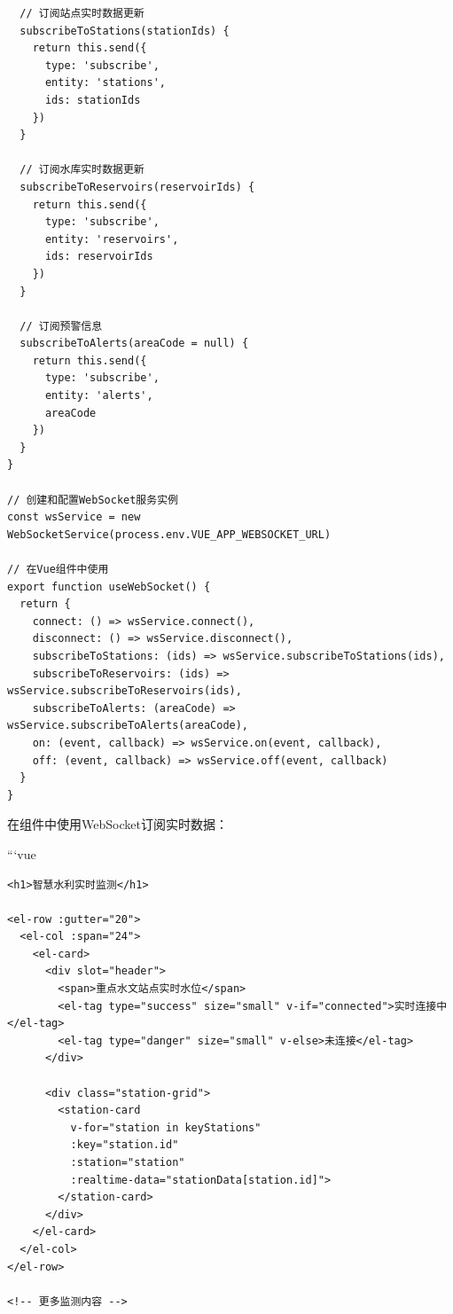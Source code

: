 \begin{lstlisting}
  // 订阅站点实时数据更新
  subscribeToStations(stationIds) {
    return this.send({
      type: 'subscribe',
      entity: 'stations',
      ids: stationIds
    })
  }
  
  // 订阅水库实时数据更新
  subscribeToReservoirs(reservoirIds) {
    return this.send({
      type: 'subscribe',
      entity: 'reservoirs',
      ids: reservoirIds
    })
  }
  
  // 订阅预警信息
  subscribeToAlerts(areaCode = null) {
    return this.send({
      type: 'subscribe',
      entity: 'alerts',
      areaCode
    })
  }
}

// 创建和配置WebSocket服务实例
const wsService = new WebSocketService(process.env.VUE_APP_WEBSOCKET_URL)

// 在Vue组件中使用
export function useWebSocket() {
  return {
    connect: () => wsService.connect(),
    disconnect: () => wsService.disconnect(),
    subscribeToStations: (ids) => wsService.subscribeToStations(ids),
    subscribeToReservoirs: (ids) => wsService.subscribeToReservoirs(ids),
    subscribeToAlerts: (areaCode) => wsService.subscribeToAlerts(areaCode),
    on: (event, callback) => wsService.on(event, callback),
    off: (event, callback) => wsService.off(event, callback)
  }
}
\end{lstlisting}

在组件中使用WebSocket订阅实时数据：

```vue

\begin{lstlisting}
<h1>智慧水利实时监测</h1>

<el-row :gutter="20">
  <el-col :span="24">
    <el-card>
      <div slot="header">
        <span>重点水文站点实时水位</span>
        <el-tag type="success" size="small" v-if="connected">实时连接中</el-tag>
        <el-tag type="danger" size="small" v-else>未连接</el-tag>
      </div>
      
      <div class="station-grid">
        <station-card 
          v-for="station in keyStations" 
          :key="station.id"
          :station="station"
          :realtime-data="stationData[station.id]">
        </station-card>
      </div>
    </el-card>
  </el-col>
</el-row>

<!-- 更多监测内容 -->
\end{lstlisting}
